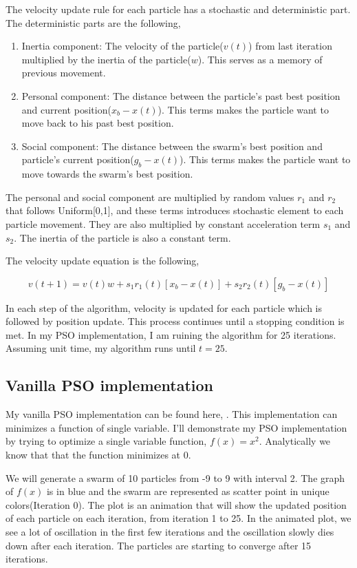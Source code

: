 \documentclass{article}
\begin{document}
The velocity update rule for each particle has a stochastic and deterministic part. The deterministic parts are the following,
\begin{enumerate}
\item Inertia component: The velocity of the particle($v(t)$) from last iteration multiplied by the inertia of the particle($w$). This serves as a memory of previous movement.
\item Personal component: The distance between the particle's past best position and current position($x_b - x(t)$). This terms makes the particle want to move back to his past best position. 
\item Social component: The distance between the swarm's best position and particle's current position($g_b - x(t)$).  This terms makes the particle want to move towards the swarm's best position.
\end{enumerate}

The personal and social component are multiplied by random values $r_1$ and $r_2$ that follows Uniform[0,1], and these terms introduces stochastic element to each particle movement. They are also multiplied by constant acceleration term $s_1$ and $s_2$. The inertia of the particle is also a constant term. 

The velocity update equation is the following,

\begin{equation}
v(t+1) = v(t)w + s_1 r_1(t)[x_b - x(t)] +  s_2 r_2(t)[g_b - x(t)]
\end{equation}

In each step of the algorithm, velocity is updated for each particle which is followed by position update. This process continues until a stopping condition is met. In my PSO implementation, I am ruining the algorithm for 25 iterations. Assuming unit time, my algorithm runs until $t=25$.

\subsection{Vanilla PSO implementation}

My vanilla PSO implementation can be found here, \cite{irfan_2021}. This implementation can minimizes a function of single variable. I'll demonstrate my PSO implementation by trying to optimize a single variable function, $f(x) = x^2$. Analytically we know that that the function minimizes at 0.

We will generate a swarm of 10 particles from -9 to 9 with interval 2. The graph of $f(x)$ is in blue and the swarm are represented as scatter point in unique colors(Iteration 0). The plot is an animation that will show the updated position of each particle on each iteration, from iteration 1 to 25. In the animated plot, we see a lot of oscillation in the first few iterations and the oscillation slowly dies down after each iteration. The particles are starting to converge after 15 iterations.  
\end{document}

